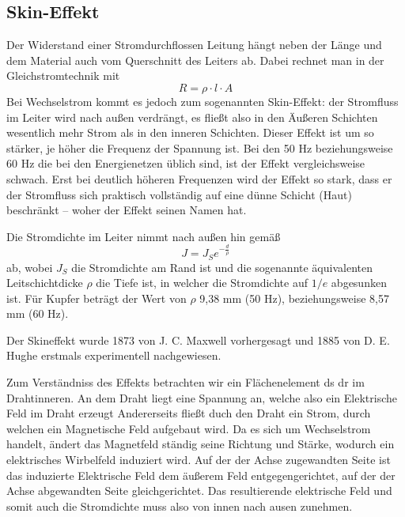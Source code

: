 
\subsection{Skin-Effekt}
Der Widerstand einer Stromdurchflossen Leitung hängt neben der Länge und dem Material auch vom Querschnitt des Leiters ab. Dabei rechnet man in der Gleichstromtechnik mit
\begin{equation}
R = \rho \cdot l \cdot A
\end{equation}
Bei Wechselstrom kommt es jedoch zum sogenannten Skin-Effekt: der Stromfluss im Leiter wird nach außen verdrängt, es fließt also in den Äußeren Schichten wesentlich mehr Strom als in den inneren Schichten. Dieser Effekt ist um so stärker, je höher die Frequenz der Spannung ist. Bei den 50 Hz beziehungsweise 60 Hz die bei den Energienetzen üblich sind, ist der Effekt vergleichsweise schwach. Erst bei deutlich höheren Frequenzen wird der Effekt so stark, dass er der Stromfluss sich praktisch vollständig auf eine dünne Schicht (Haut) beschränkt -- woher der Effekt seinen Namen hat.

Die Stromdichte im Leiter nimmt nach außen hin gemäß
\begin{equation}
J = J_S e^{-\frac{d}{\rho}}
\end{equation}
ab, wobei $J_S$ die Stromdichte am Rand ist und die sogenannte äquivalenten Leitschichtdicke $\rho$ die Tiefe ist, in welcher die Stromdichte auf $1/e$ abgesunken ist. Für Kupfer beträgt der Wert von $\rho$ 9,38 mm (50 Hz), beziehungsweise 8,57 mm (60 Hz).

Der Skineffekt wurde 1873 von J. C. Maxwell vorhergesagt und 1885 von D. E. Hughe erstmals experimentell nachgewiesen\cite{BergmannSchaefer}.

Zum Verständniss des Effekts betrachten wir ein Flächenelement ds dr im Drahtinneren.
An dem Draht liegt eine Spannung an, welche also ein Elektrische Feld im Draht erzeugt
Andererseits fließt duch den Draht ein Strom, durch welchen ein Magnetische Feld aufgebaut wird.
Da es sich um Wechselstrom handelt, ändert das Magnetfeld ständig seine Richtung und Stärke, wodurch ein elektrisches Wirbelfeld induziert wird.
Auf der der Achse zugewandten Seite ist das induzierte Elektrische Feld dem äußerem Feld entgegengerichtet, auf der der Achse abgewandten Seite gleichgerichtet.
Das resultierende elektrische Feld und somit auch die Stromdichte muss also von innen nach ausen zunehmen.

